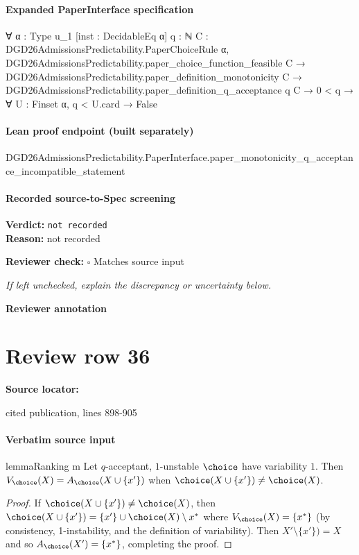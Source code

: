 \documentclass[10pt]{article}
\newcommand{\reviewerbox}{%
  \par\noindent\fbox{\parbox{0.96\linewidth}{\rule{0pt}{0.38in}}}\par
}
\newcommand{\reviewmatch}[1]{%
  \par\noindent\textbf{Reviewer check:} $\square$\; #1\par
  \noindent\emph{If left unchecked, explain the discrepancy or uncertainty below.}\par
}
\begin{document}
\paragraph{Expanded PaperInterface specification}
\begin{ReviewVerbatim}
∀ {α : Type u_1} [inst : DecidableEq α] {q : ℕ} {C : DGD26AdmissionsPredictability.PaperChoiceRule α},
  DGD26AdmissionsPredictability.paper_choice_function_feasible C →
    DGD26AdmissionsPredictability.paper_definition_monotonicity C →
      DGD26AdmissionsPredictability.paper_definition_q_acceptance q C → 0 < q → ∀ {U : Finset α}, q < U.card → False
\end{ReviewVerbatim}

\paragraph{Lean proof endpoint (built separately)}\begin{ReviewVerbatim}
DGD26AdmissionsPredictability.PaperInterface.paper_monotonicity_q_acceptance_incompatible_statement
\end{ReviewVerbatim}

\paragraph{Recorded source-to-Spec screening}
\textbf{Verdict:} \texttt{not recorded}
\\
\textbf{Reason:} not recorded
\reviewmatch{Matches source input}
\noindent\textbf{Reviewer annotation}\par
\reviewerbox
\clearpage
\hypertarget{source-claim-f926138cb2114337}{}
\section*{Review row 36}
\textbf{Source locator:} {\footnotesize\raggedright cited publication, lines 898-\allowbreak{}905\par}
\paragraph{Verbatim source input}
\begin{ReviewVerbatim}
\begin{restatable}{lemma}{Ranking m}
\label{lem:a-v-equal}
Let $q$-acceptant, $1$-unstable $\choice$ have variability $1$. Then $V_\choice(X) = A_\choice(X \cup \{x'\})$ when $\choice(X \cup \{x'\}) \neq \choice(X)$.
\end{restatable}

\begin{proof}
If $\choice(X \cup \{x'\}) \neq \choice(X)$, then $\choice(X \cup \{x'\}) = \{x'\} \cup \choice(X) \setminus x^*$ where $V_\choice(X) = \{x^*\}$ (by consistency, 1-instability, and the definition of variability). Then $X' \setminus \{x'\}) = X$ and so $A_\choice(X') = \{x^*\}$, completing the proof.
\end{proof}
\end{ReviewVerbatim}
\end{document}
